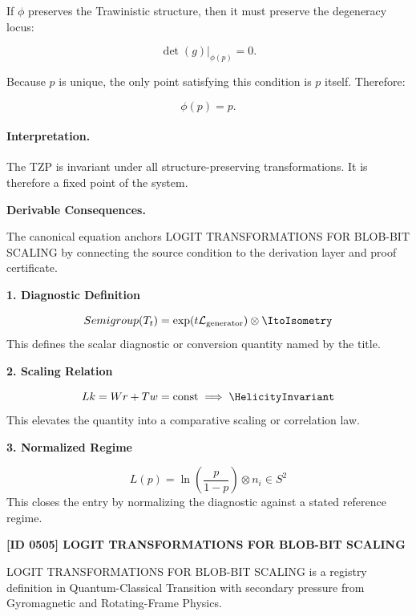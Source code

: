 If $\phi$ preserves the Trawinistic structure, then it must preserve the degeneracy locus:

\begin{equation}
\det(g)\big|_{\phi(p)}=0 .
\end{equation}

Because $p$ is unique, the only point satisfying this condition is $p$ itself. Therefore:

\begin{equation}
\phi(p)=p .
\end{equation}

\paragraph{Interpretation.}
The TZP is invariant under all structure-preserving transformations. It is therefore a fixed point of the system.

\par\vspace{0.35em}
\noindent\textbf{Derivable Consequences.}\quad
\begingroup
\footnotesize
\raggedright
The canonical equation anchors LOGIT TRANSFORMATIONS FOR BLOB-BIT SCALING by connecting the source condition to the derivation layer and proof certificate.
\par\endgroup

\noindent\textbf{1. Diagnostic Definition}\par
\[
Semigroup(T_t) = \exp(t \mathcal{L}_{\text{generator}}) \otimes \ItoIsometry
\]
\noindent This defines the scalar diagnostic or conversion quantity named by the title.\par
\noindent\textbf{2. Scaling Relation}\par
\[
Lk = Wr + Tw = \text{const} \implies \HelicityInvariant
\]
\noindent This elevates the quantity into a comparative scaling or correlation law.\par
\noindent\textbf{3. Normalized Regime}\par
\[
L(p) = \ln\left(\frac{p}{1-p}\right) \otimes n_i \in S^2
\]
\noindent This closes the entry by normalizing the diagnostic against a stated reference regime.\par

\clearpage
\noindent\textbf{[ID 0505] LOGIT TRANSFORMATIONS FOR BLOB-BIT SCALING}\par
\vspace{0.35em}
\begingroup\small
{}
LOGIT TRANSFORMATIONS FOR BLOB-BIT SCALING is a registry definition in Quantum-Classical Transition with secondary pressure from Gyromagnetic and Rotating-Frame Physics.


